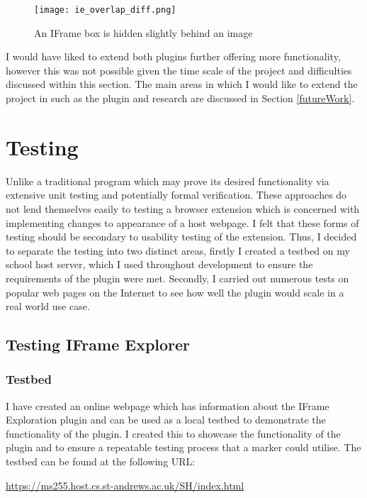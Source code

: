 \documentclass[12pt]{article}
\begin{document}
\begin{figure}[H]
    \centering
    \texttt{[image: ie\_overlap\_diff.png]}
    \caption{An IFrame box is hidden slightly behind an image}
    \label{fig:ie_overlap_diff}
\end{figure}

I would have liked to extend both plugins further offering more functionality, however this was not possible given the time scale of the project and difficulties discussed within this section. The main areas in which I would like to extend the project in such as the plugin and research are discussed in Section \ref{futureWork}.

\pagebreak

\section{Testing}
Unlike a traditional program which may prove its desired functionality via extensive unit testing and potentially formal verification. These approaches do not lend themselves easily to testing a browser extension which is concerned with implementing changes to appearance of a host webpage. I felt that these forms of testing should be secondary to usability testing of the extension. Thus, I decided to separate the testing into two distinct areas, firstly I created a testbed on my school host server, which I used throughout development to ensure the requirements of the plugin were met. Secondly, I carried out numerous tests on popular web pages on the Internet to see how well the plugin would scale in a real world use case. 

\subsection{Testing IFrame Explorer}

\subsubsection{Testbed}
I have created an online webpage which has information about the IFrame Exploration plugin and can be used as a local testbed to demonstrate the functionality of the plugin. I created this to showcase the functionality of the plugin and to ensure a repeatable testing process that a marker could utilise. The testbed can be found at the following URL: 

\begin{center}
\url{https://ms255.host.cs.st-andrews.ac.uk/SH/index.html}
\end{center}
\end{document}
